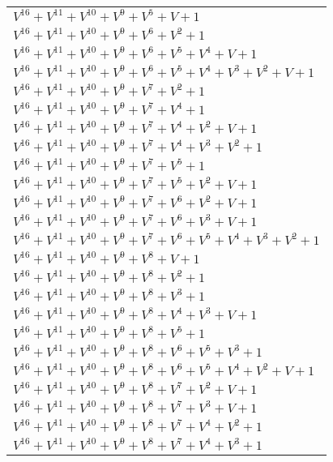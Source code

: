 \documentclass[12pt]{article}
\begin{document}
\begin{adjustwidth}{-4cm}{}
\begin{center}
\begin{longtable}{|l|}
$V^{16}  +V^{11}  +V^{10}  +V^{9}  +V^{5}  + V + 1$ \\
$V^{16}  +V^{11}  +V^{10}  +V^{9}  +V^{6}  +V^{2}  + 1$ \\
$V^{16}  +V^{11}  +V^{10}  +V^{9}  +V^{6}  +V^{5}  +V^{4}  + V + 1$ \\
$V^{16}  +V^{11}  +V^{10}  +V^{9}  +V^{6}  +V^{5}  +V^{4}  +V^{3}  +V^{2}  + V + 1$ \\
$V^{16}  +V^{11}  +V^{10}  +V^{9}  +V^{7}  +V^{2}  + 1$ \\
$V^{16}  +V^{11}  +V^{10}  +V^{9}  +V^{7}  +V^{4}  + 1$ \\
$V^{16}  +V^{11}  +V^{10}  +V^{9}  +V^{7}  +V^{4}  +V^{2}  + V + 1$ \\
$V^{16}  +V^{11}  +V^{10}  +V^{9}  +V^{7}  +V^{4}  +V^{3}  +V^{2}  + 1$ \\
$V^{16}  +V^{11}  +V^{10}  +V^{9}  +V^{7}  +V^{5}  + 1$ \\
$V^{16}  +V^{11}  +V^{10}  +V^{9}  +V^{7}  +V^{5}  +V^{2}  + V + 1$ \\
$V^{16}  +V^{11}  +V^{10}  +V^{9}  +V^{7}  +V^{6}  +V^{2}  + V + 1$ \\
$V^{16}  +V^{11}  +V^{10}  +V^{9}  +V^{7}  +V^{6}  +V^{3}  + V + 1$ \\
$V^{16}  +V^{11}  +V^{10}  +V^{9}  +V^{7}  +V^{6}  +V^{5}  +V^{4}  +V^{3}  +V^{2}  + 1$ \\
$V^{16}  +V^{11}  +V^{10}  +V^{9}  +V^{8}  + V + 1$ \\
$V^{16}  +V^{11}  +V^{10}  +V^{9}  +V^{8}  +V^{2}  + 1$ \\
$V^{16}  +V^{11}  +V^{10}  +V^{9}  +V^{8}  +V^{3}  + 1$ \\
$V^{16}  +V^{11}  +V^{10}  +V^{9}  +V^{8}  +V^{4}  +V^{3}  + V + 1$ \\
$V^{16}  +V^{11}  +V^{10}  +V^{9}  +V^{8}  +V^{5}  + 1$ \\
$V^{16}  +V^{11}  +V^{10}  +V^{9}  +V^{8}  +V^{6}  +V^{5}  +V^{3}  + 1$ \\
$V^{16}  +V^{11}  +V^{10}  +V^{9}  +V^{8}  +V^{6}  +V^{5}  +V^{4}  +V^{2}  + V + 1$ \\
$V^{16}  +V^{11}  +V^{10}  +V^{9}  +V^{8}  +V^{7}  +V^{2}  + V + 1$ \\
$V^{16}  +V^{11}  +V^{10}  +V^{9}  +V^{8}  +V^{7}  +V^{3}  + V + 1$ \\
$V^{16}  +V^{11}  +V^{10}  +V^{9}  +V^{8}  +V^{7}  +V^{4}  +V^{2}  + 1$ \\
$V^{16}  +V^{11}  +V^{10}  +V^{9}  +V^{8}  +V^{7}  +V^{4}  +V^{3}  + 1$ \\

\end{longtable}
\end{center}
\end{adjustwidth}
\end{document}
